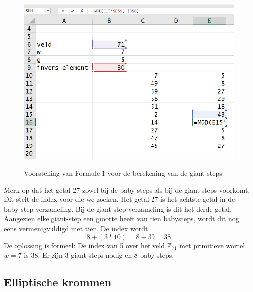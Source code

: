 \documentclass{article}
\begin{document}
\begin{enumerate}
\begin{figure}
  \begin{center}
  \caption{Voorstelling van Formule 1 voor de berekening van de giant-steps}
  \includegraphics[width=\textwidth]{babystep_giantstep_3}
  \label{fig:babystep_giantstep_3}
  \end{center}
\end{figure}
  
Merk op dat het getal 27 zowel bij de baby-steps als bij de giant-steps voorkomt. Dit stelt de index voor die we zoeken. Het getal 27 is het achtste getal in de baby-step verzameling. Bij de giant-step verzameling is dit het derde getal. Aangezien elke giant-step een grootte heeft van tien babysteps, wordt dit nog eens vermenigvuldigd met tien. De index wordt $$8 + (3 * 10) = 8 + 30 = 38$$
De oplossing is formeel: De index van 5 over het veld $\mathbb{Z}_{71}$ met primitieve wortel $w = 7$ is 38. Er zijn 3 giant-steps nodig en 8 baby-steps.

\subsection{Elliptische krommen}
 
\end{enumerate}
\end{document}
